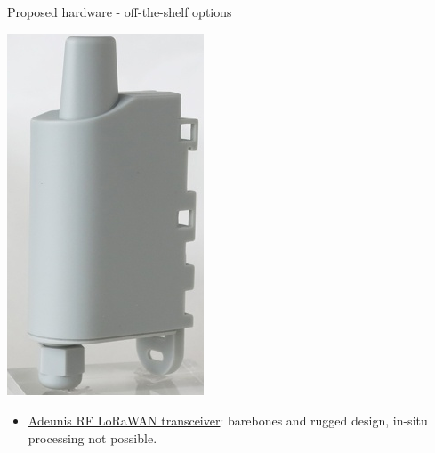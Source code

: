 \documentclass{beamer}
\newcommand{\myhref}[2]{{\color{blue}\href{#1}{#2}}}
\begin{document}
\begin{frame}{Proposed hardware - off-the-shelf options}
        \begin{minipage}{0.48\linewidth}
            \begin{center}
                \includegraphics[scale=0.2]{figures/adeunis.PNG}
            \end{center}
        \end{minipage}
        \begin{minipage}{0.48\linewidth}
        \begin{itemize}
            \item \myhref{http://www.adeunis-rf.com/en/products/lorawan-products}{Adeunis RF LoRaWAN transceiver}: barebones and rugged design, in-situ processing not possible.
        \end{itemize}
        \end{minipage}
    \end{frame}
\end{document}
